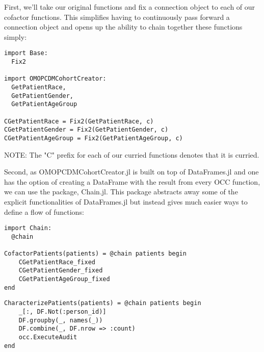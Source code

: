 \documentclass{juliacon}
\begin{document}
First, we'll take our original functions and fix a connection object to each of our cofactor functions.
This simplifies having to continuously pass forward a connection object and opens up the ability to chain together these functions simply:

\begin{verbatim}
import Base:
  Fix2

import OMOPCDMCohortCreator:
  GetPatientRace,
  GetPatientGender,
  GetPatientAgeGroup

CGetPatientRace = Fix2(GetPatientRace, c)
CGetPatientGender = Fix2(GetPatientGender, c)
CGetPatientAgeGroup = Fix2(GetPatientAgeGroup, c)
\end{verbatim}

NOTE: The "C" prefix for each of our curried functions denotes that it is curried.

Second, as OMOPCDMCohortCreator.jl is built on top of DataFrames.jl and one has the option of creating a DataFrame with the result from every OCC function, we can use the package, Chain.jl.
This package abstracts away some of the explicit functionalities of DataFrames.jl but instead gives much easier ways to define a flow of functions:

\begin{verbatim}
import Chain:
  @chain

CofactorPatients(patients) = @chain patients begin
    CGetPatientRace_fixed
    CGetPatientGender_fixed
    CGetPatientAgeGroup_fixed
end
\end{verbatim}

\begin{verbatim}
CharacterizePatients(patients) = @chain patients begin
    _[:, DF.Not(:person_id)]
    DF.groupby(_, names(_))
    DF.combine(_, DF.nrow => :count)
    occ.ExecuteAudit
end
\end{verbatim}
\end{document}
